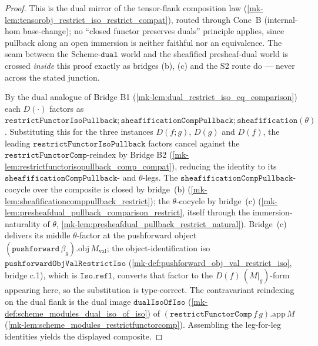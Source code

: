 \begin{proof}
  \leanok
  This is the dual mirror of the tensor-flank composition law
  (\ref{mk-lem:tensorobj_restrict_iso_restrict_compat}), routed through Cone~B (internal-hom base-change);
  no ``closed functor preserves duals'' principle applies, since pullback along an open immersion is
  neither faithful nor an equivalence. The seam between the Scheme-\(\mathtt{dual}\) world and the
  sheafified presheaf-dual world is crossed \emph{inside} this proof exactly as bridges (b), (c) and the
  S2 route do --- never across the stated junction.

  By the dual analogue of Bridge B1 (\ref{mk-lem:dual_restrict_iso_eq_comparison}) each
  \(D(\cdot)\) factors as \(\mathtt{restrictFunctorIsoPullback} \mathbin{;}
  \mathtt{sheafificationCompPullback} \mathbin{;} \mathtt{sheafification}(\theta)\). Substituting this for
  the three instances \(D(f\mathbin{;}g)\), \(D(g)\) and \(D(f)\), the leading
  \(\mathtt{restrictFunctorIsoPullback}\) factors cancel against the
  \(\mathtt{restrictFunctorComp}\)-reindex by Bridge B2 (\ref{mk-lem:restrictfunctorisopullback_comp_compat}),
  reducing the identity to its \(\mathtt{sheafificationCompPullback}\)- and \(\theta\)-legs. The
  \(\mathtt{sheafificationCompPullback}\)-cocycle over the composite is closed by bridge~(b)
  (\ref{mk-lem:sheafificationcomppullback_restrict}); the \(\theta\)-cocycle by bridge~(c)
  (\ref{mk-lem:presheafdual_pullback_comparison_restrict}, itself through the immersion-naturality of
  \(\theta\), \ref{mk-lem:presheafdual_pullback_restrict_natural}). Bridge~(c) delivers its middle
  \(\theta\)-factor at the pushforward object \((\mathtt{pushforward}\,\beta_g).\mathrm{obj}\,M_{\mathrm{val}}\);
  the object-identification iso \(\mathtt{pushforwardObjValRestrictIso}\)
  (\ref{mk-def:pushforward_obj_val_restrict_iso}, bridge c.1), which is \(\mathtt{Iso.refl}\), converts that
  factor to the \(D(f)\,(M|_g)\)-form appearing here, so the substitution is type-correct. The
  contravariant reindexing on the dual flank is the dual image
  \(\mathtt{dualIsoOfIso}\) (\ref{mk-def:scheme_modules_dual_iso_of_iso}) of
  \((\mathtt{restrictFunctorComp}\,f\,g).\mathrm{app}\,M\)
  (\ref{mk-lem:scheme_modules_restrictfunctorcomp}). Assembling the leg-for-leg identities yields the
  displayed composite.
\end{proof}

